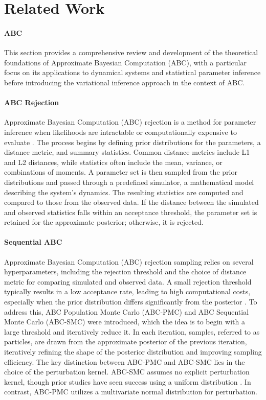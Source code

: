 \documentclass[12pt]{article} %
\newcommand{\para}[1]{\vspace*{-4.5mm}\paragraph{#1}}
\newcommand{\red}[1]{{\color{red}{#1}}}
\begin{document}
\section*{Related Work}

\para{ABC}
This section provides a comprehensive review and development of the theoretical foundations of Approximate Bayesian Computation (ABC), with a particular focus on its applications to dynamical systems and statistical parameter inference before introducing the variational inference approach in the context of ABC. 

\para{ABC Rejection}
Approximate Bayesian Computation (ABC) rejection is a method for parameter inference when likelihoods are intractable or computationally expensive to evaluate \citep{tavare1997inferring}. The process begins by defining prior distributions for the parameters, a distance metric, and summary statistics. Common distance metrics include L1 and L2 distances, while statistics often include the mean, variance, or combinations of moments. A parameter set is then sampled from the prior distributions and passed through a predefined simulator, a mathematical model describing the system's dynamics. The resulting statistics are computed and compared to those from the observed data. If the distance between the simulated and observed statistics falls within an acceptance threshold, the parameter set is retained for the approximate posterior; otherwise, it is rejected.

\para{Sequential ABC}
Approximate Bayesian Computation (ABC) rejection sampling relies on several hyperparameters, including the rejection threshold and the choice of distance metric for comparing simulated and observed data. A small rejection threshold typically results in a low acceptance rate, leading to high computational costs, especially when the prior distribution differs significantly from the posterior \citep{toni2009approximate}. To address this, ABC Population Monte Carlo (ABC-PMC) and ABC Sequential Monte Carlo (ABC-SMC) were introduced, which the idea is to begin with a large threshold and iteratively reduce it. In each iteration, samples, referred to as particles, are drawn from the approximate posterior of the previous iteration, iteratively refining the shape of the posterior distribution and improving sampling efficiency. The key distinction between ABC-PMC and ABC-SMC lies in the choice of the perturbation kernel. ABC-SMC assumes no explicit perturbation kernel, though prior studies have seen success using a uniform distribution \red{cite}. In contrast, ABC-PMC utilizes a multivariate normal distribution for perturbation.
\end{document}
